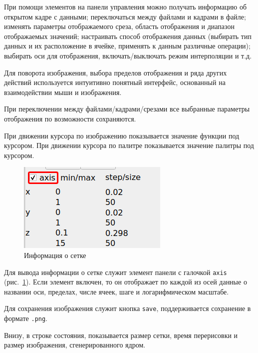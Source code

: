 \documentclass[12pt]{article}
\begin{document}
При помощи элементов на панели управления можно получать информацию об открытом кадре с данными; переключаться между файлами и кадрами в файле;
изменять параметры отображаемого среза, область отображения и диапазон отображаемых значений; настраивать способ отображения данных (выбирать
тип данных и их расположение в ячейке, применять к данным различные операции); выбирать оси для отображения, включать/выключать режим интерполяции и т.д.

Для поворота изображения, выбора пределов отображения и ряда других действий используется интуитивно понятный интерфейс,
основанный на взаимодействии мыши и изображения.

При переключении между файлами/кадрами/срезами все выбранные параметры отображения по возможности сохраняются.

При движении курсора по изображению показывается значение функции под курсором. 
При движении курсора по палитре показывается значение палитры под курсором. 

\begin{figure}[h]
  \begin{center}
      \includegraphics[width=.28\textwidth]{picts/show-axis.png} 
  \end{center}
  \caption{Информация о сетке}\label{show:axis:pict}
\end{figure}
Для вывода информации о сетке служит элемент панели с галочкой \verb'axis' (рис.~\ref{show:axis:pict}).
Если элемент включен, то он отображает по каждой из осей данные о названии оси, пределах, числе ячеек, шаге и логарифмическом масштабе.

Для сохранения изображения служит кнопка \verb'save', поддерживается сохранение в формате \verb'.png'.

Внизу, в строке состояния, показывается размер сетки, время перерисовки и размер изображения, сгенерированного ядром.
\end{document}

